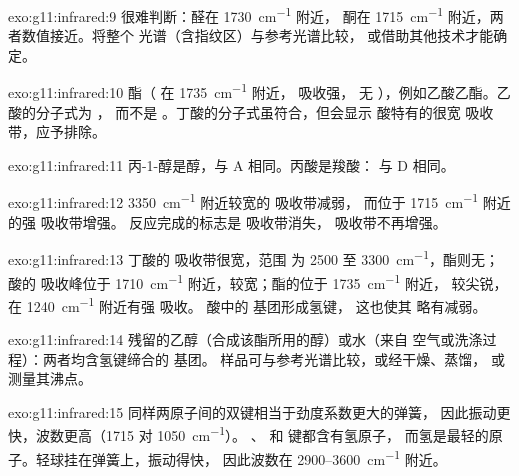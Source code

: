 \begin{solution}{exo:g11:infrared:9}
很难判断：醛在 \qty{1730}{cm^{-1}} 附近，
酮在 \qty{1715}{cm^{-1}} 附近，两者数值接近。将整个
光谱（含指纹区）与参考光谱比较，
或借助其他技术才能确定。
\end{solution}

\begin{solution}{exo:g11:infrared:10}
酯（ 在 \qty{1735}{cm^{-1}} 附近， 吸收强，
无 ），例如乙酸乙酯。乙酸的分子式为 ，
而不是 。丁酸的分子式虽符合，但会显示
酸特有的很宽  吸收带，应予排除。
\end{solution}

\begin{solution}{exo:g11:infrared:11}
丙-1-醇是醇，与 A 相同。丙酸是羧酸：
与 D 相同。
\end{solution}

\begin{solution}{exo:g11:infrared:12}
\qty{3350}{cm^{-1}} 附近较宽的  吸收带减弱，
而位于 \qty{1715}{cm^{-1}} 附近的强  吸收带增强。
反应完成的标志是  吸收带消失，
 吸收带不再增强。
\end{solution}

\begin{solution}{exo:g11:infrared:13}
丁酸的  吸收带很宽，范围
为 2500 至 \qty{3300}{cm^{-1}}，酯则无；
酸的  吸收峰位于 \qty{1710}{cm^{-1}} 附近，较宽；酯的位于 \qty{1735}{cm^{-1}} 附近，
较尖锐，在 \qty{1240}{cm^{-1}} 附近有强  吸收。
酸中的  基团形成氢键，
这也使其  略有减弱。
\end{solution}

\begin{solution}{exo:g11:infrared:14}
残留的乙醇（合成该酯所用的醇）或水（来自
空气或洗涤过程）：两者均含氢键缔合的  基团。
样品可与参考光谱比较，或经干燥、蒸馏，
或测量其沸点。
\end{solution}

\begin{solution}{exo:g11:infrared:15}
同样两原子间的双键相当于劲度系数更大的弹簧，
因此振动更快，波数更高（1715 对 \qty{1050}{cm^{-1}}）。
、 和  键都含有氢原子，
而氢是最轻的原子。轻球挂在弹簧上，振动得快，
因此波数在 2900--\qty{3600}{cm^{-1}} 附近。
\end{solution}

